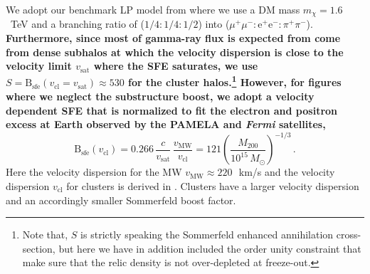 \documentclass[10pt,aps,pra,reprint,amsmath,amsfonts,amssymb,showpacs,nofootinbib,floatfix]{revtex4-1}
\def\del#1{{}}
\def\C#1{{\bf #1}}
\newcommand{\Fermi}{{\em Fermi}\xspace}
\newcommand{\rmn}{\mathrm}
\newcommand{\sfe}{\rmn{sfe}}
\newcommand{\msun}{M_\odot}
\newcommand{\B}{\rmn{B}}
\newcommand{\sigv}{v_\rmn{cl}}
\newcommand{\mvir}{M_{200}}
\newcommand{\e}{\rmn{e}}
\begin{document}
We adopt our benchmark LP model from \cite{Finkbeiner:2010sm} where we
use a DM mass $m_\chi=1.6$~TeV and a branching ratio of
($1/4:1/4:1/2$) into
($\mu^+\mu^-:\e^+\e^-:\pi^+\pi^-$). \del{\footnote{This is an
    approximation to the model found in \cite{Finkbeiner:2010sm} that
    has a branching ratio of ($1/4:1/4:1/2$) into
    ($\mu^+\mu^-:\e^+\e^-:\pi^+\pi^-$).}} \C{Furthermore, since most
  of gamma-ray flux is expected from come from dense subhalos at which
  the velocity dispersion is close to the velocity limit $v_\rmn{sat}$
  where the SFE saturates, we use $S=\B_\sfe(\sigv=v_\rmn{sat})\approx
  530$ for the cluster halos.\footnote{Note that, $S$ is strictly
    speaking the Sommerfeld enhanced annihilation cross-section, but
    here we have in addition included the order unity constraint that
    make sure that the relic density is not over-depleted at
    freeze-out.} However, for figures where we neglect the
  substructure boost, we adopt a velocity dependent SFE that is
  normalized to fit the electron and positron excess at Earth observed
  by the PAMELA and \Fermi satellites,}
\begin{equation}
\B_\sfe(\sigv) = 0.266\, \frac{c}{v_\rmn{sat}}\, \frac{v_\rmn{MW}}{\sigv} = 
121 \left(\frac{\mvir}{10^{15}\,\msun}\right)^{-1/3}\,.
\label{eq:B_sfe}
\end{equation}
Here the velocity dispersion for the MW $v_\rmn{MW} \approx
220\,$~km/s and the velocity dispersion $\sigv$ for clusters is
derived in \cite{2005RvMP...77..207V}. Clusters have a larger velocity
dispersion and an accordingly smaller Sommerfeld boost factor.
\end{document}
